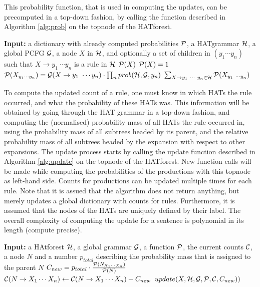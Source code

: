 This probability function, that is used in computing the updates, can be precomputed in a top-down fashion, by calling the function described in Algorithm \ref{alg:prob} on the topnode of the HATforest.

\begin{algorithm}
\caption{$prob(\Pp, \Hg,\G,X,(y_1,\cdots,y_n) = None$)}\label{alg:prob}
\begin{algorithmic}
\STATE \textbf{Input:} a dictionary with already computed probabilities $\mathcal{P}$, a HATgrammar $\mathcal{H}$, a global PCFG $\mathcal{G}$, a node $X$ in $\mathcal{H}$, and optionally a set of children in $(y_1\cdots y_n)$ such that $X\rightarrow y_1~\cdots y_n$ is a rule in $\mathcal{H}$
\STATE
{}
	\RETURN $\mathcal{P}(X)$
	\STATE
{}
	\RETURN $\mathcal{P}(X)=1$
	\STATE
{}
	\RETURN $\mathcal{P}(X_{y_1\cdots y_n}) = \mathcal{G}(X\rightarrow y_1~\cdots y_n)\cdot\prod_{n}prob(\mathcal{H},\mathcal{G},y_n)$
	\STATE
\ELSE
	\RETURN $\sum_{X\rightarrow y_1~\cdots ~y_n \in\mathcal{H}} \mathcal{P}(X_{y_1~\cdots y_n})$
	\STATE
\ENDIF
\end{algorithmic}
\end{algorithm}

To compute the updated count of a rule, one must know in which HATs the rule occurred, and what the probability of these HATs was. This information will be obtained by going through the HAT grammar in a top-down fashion, and computing the (normalised) probability mass of all HATs the rule occurred in, using the probability mass of all subtrees headed by its parent, and the relative probability mass of all subtrees headed by the expansion with respect to other expansions. 
The update process starts by calling the update function described in Algorithm \ref{alg:update} on the topnode of the HATforest. New function calls will be made while computing the probabilities of the productions with this topnode as left-hand side. Counts for productions can be updated multiple times for each rule. Note that it is assued that the algorithm does not return anything, but merely updates a global dictionary with counts for rules. Furthermore, it is assumed that the nodes of the HATs are uniquely defined by their label. The overall complexity of computing the update for a sentence is polynomial in its length (compute precise).

\begin{algorithm}[!ht]
\caption{$update(N,\Hg,\G,\Pp,\C,p_{total})$}\label{alg:update}
\begin{algorithmic}
\STATE \textbf{Input:} a HAtforest $\mathcal{H}$, a global grammar $\mathcal{G}$, a function $\mathcal{P}$, the current counts $\mathcal{C}$, a node $N$ and a number $p_{total}$ describing the probability mass that is assigned to the parent $N$
\STATE
{}
	\RETURN
\ENDIF
{}
	\STATE $C_{new} = p_{total}\cdot\frac{\mathcal{P}(N_{X_1\cdots X_n})}{\mathcal{P}(N)}$
	\STATE $\mathcal{C}(N\rightarrow X_1\cdots X_n) \leftarrow \mathcal{C}(N\rightarrow X_1\cdots X_n) + C_{new}  $
		\STATE $update(X,\mathcal{H},\mathcal{G},\mathcal{P},\mathcal{C},C_{new}))$
	\ENDFOR
\ENDFOR
\end{algorithmic}
\end{algorithm}

